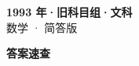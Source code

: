 \documentclass[zihao=-4, a4paper]{ctexart}
\begin{document}
\begin{center}
  {\Large\bfseries 1993 年·旧科目组·文科}\\[4pt]
  {\large 数学 · 简答版}
\end{center}
\medskip
{}

\clearpage
{}
\begin{center}{\Large\bfseries 答案速查}\end{center}
\medskip

\end{document}
